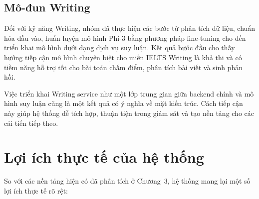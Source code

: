 \subsection{Mô-đun Writing}
Đối với kỹ năng Writing, nhóm đã thực hiện các bước từ phân tích dữ liệu, chuẩn hóa đầu vào, huấn luyện mô hình Phi-3 bằng phương pháp fine-tuning cho đến triển khai mô hình dưới dạng dịch vụ suy luận. Kết quả bước đầu cho thấy hướng tiếp cận mô hình chuyên biệt cho miền IELTS Writing là khả thi và có tiềm năng hỗ trợ tốt cho bài toán chấm điểm, phân tích bài viết và sinh phản hồi.

Việc triển khai Writing service như một lớp trung gian giữa backend chính và mô hình suy luận cũng là một kết quả có ý nghĩa về mặt kiến trúc. Cách tiếp cận này giúp hệ thống dễ tích hợp, thuận tiện trong giám sát và tạo nền tảng cho các cải tiến tiếp theo.

\section{Lợi ích thực tế của hệ thống}

So với các nền tảng hiện có đã phân tích ở Chương~3, hệ thống mang lại một số lợi ích thực tế rõ rệt:

